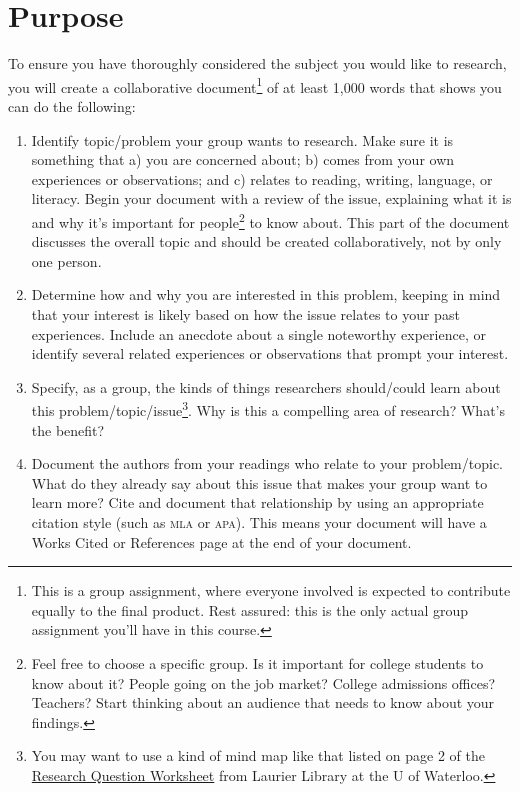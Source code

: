 \documentclass[12pt,oneside]{amsart}	%
\begin{document}
\section{Purpose} %
\label{sec:purpose}
To ensure you have thoroughly considered the subject you would like to research, you will create a collaborative document\footnote{This is a group assignment, where everyone involved is expected to contribute equally to the final product. Rest assured: this is the only actual group assignment you'll have in this course.} of at least 1,000 words that shows you can do the following:
\begin{enumerate}
	\item Identify topic/problem your group wants to research. Make sure it is something that a) you are concerned about; b) comes from your own experiences or observations; and c) relates to reading, writing, language, or literacy. Begin your document with a review of the issue, explaining what it is and why it's important for people\footnote{Feel free to choose a specific group. Is it important for college students to know about it? People going on the job market? College admissions offices? Teachers? Start thinking about an audience that needs to know about your findings.} to know about. This part of the document discusses the overall topic and should be created collaboratively, not by only one person.
	\item  Determine how and why you are interested in this problem, keeping in mind that your interest is likely based on how the issue relates to your past experiences. Include an anecdote about a single noteworthy experience, or identify several related experiences or observations that prompt your interest.
	\item  Specify, as a group, the kinds of things researchers should/could learn about this problem/topic/issue\footnote{You may want to use a kind of mind map like that listed on page 2 of the \href{http://library.wlu.ca/sites/all/pdf/research_question_worksheet.pdf}{Research Question Worksheet} from Laurier Library at the U of Waterloo.}. Why is this a compelling area of research? What's the benefit?
	\item  Document the authors from your readings who relate to your problem/topic. What do they already say about this issue that makes your group want to learn more? Cite and document that relationship by using an appropriate citation style (such as \textsc{mla} or \textsc{apa}). This means your document will have a Works Cited or References page at the end of your document.
\end{enumerate}
\end{document}
